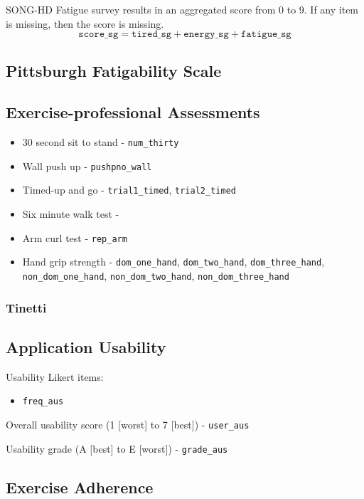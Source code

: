 \documentclass[
]{article}
\providecommand{\tightlist}{%
  \setlength{\itemsep}{0pt}\setlength{\parskip}{0pt}}
\begin{document}
SONG-HD Fatigue survey results in an aggregated score from 0 to 9.
If any item is missing, then the score is missing.
$$
\texttt{score\_sg} = \texttt{tired\_sg} + \texttt{energy\_sg} + \texttt{fatigue\_sg}
$$

\subsection{Pittsburgh Fatigability Scale}

\subsection{Exercise-professional Assessments}

\begin{itemize}\tightlist
  \item 30 second sit to stand - \texttt{num\_thirty}
  \item Wall push up - \texttt{pushpno\_wall}
  \item Timed-up and go - \texttt{trial1\_timed}, \texttt{trial2\_timed}
  \item Six minute walk test - 
  \item Arm curl test - \texttt{rep\_arm}
  \item Hand grip strength - \texttt{dom\_one\_hand}, \texttt{dom\_two\_hand}, \texttt{dom\_three\_hand}, 
    \texttt{non\_dom\_one\_hand}, \texttt{non\_dom\_two\_hand}, \texttt{non\_dom\_three\_hand}
\end{itemize}

\subsubsection{Tinetti}


\subsection{Application Usability}

Usability Likert items:
\begin{itemize}\tightlist
  \item \texttt{freq\_aus}
\end{itemize}

Overall usability score (1 [worst] to 7 [best]) - \texttt{user\_aus}

Usability grade (A [best] to E [worst]) - \texttt{grade\_aus}


\subsection{Exercise Adherence}
\end{document}
